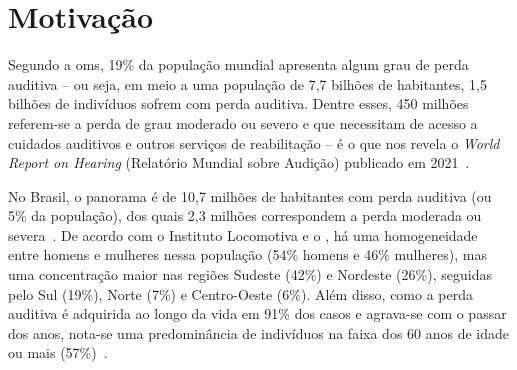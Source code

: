 \section{Motivação}
\label{motivacao}

Segundo a \acrfull{oms}, 19\% da população mundial apresenta algum grau de perda auditiva -- ou seja, em meio a uma população de 7,7 bilhões de habitantes, 1,5 bilhões de indivíduos sofrem com perda auditiva. Dentre esses, 450 milhões referem-se a perda de grau moderado ou severo e que necessitam de acesso a cuidados auditivos e outros serviços de reabilitação -- é o que nos revela o \textit{World Report on Hearing} (Relatório Mundial sobre Audição) publicado em 2021~\cite{who-2021-report-hearing}.




No Brasil, o panorama é de 10,7 milhões de habitantes com perda auditiva (ou 5\% da população), dos quais 2,3 milhões correspondem a perda moderada ou severa~\cite{ebc-2019-10-milhoes-pessoas, ibge-2021-pns, ibge-2021-projecao-populacao}. De acordo com o Instituto Locomotiva e o \citeauthor{ibge-2021-pns}, há uma homogeneidade entre homens e mulheres nessa população (54\% homens e 46\% mulheres), mas uma concentração maior nas regiões Sudeste (42\%) e Nordeste (26\%), seguidas pelo Sul (19\%), Norte (7\%) e Centro-Oeste (6\%). Além disso, como a perda auditiva é adquirida ao longo da vida em 91\% dos casos e agrava-se com o passar dos anos, nota-se uma predominância de indivíduos na faixa dos 60 anos de idade ou mais (57\%)~\cite{ebc-2019-10-milhoes-pessoas, ibge-2021-pns}.

